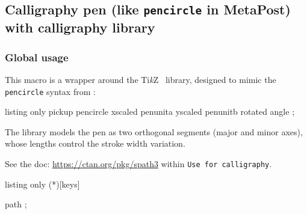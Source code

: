 \documentclass[11pt,a4paper]{ltxdoc}
\providecommand\tikzlogo{Ti\textit{k}Z}
\let\TikZ\tikzlogo
\begin{document}
\pagebreak

\subsection{Calligraphy pen (like \texttt{pencircle} in MetaPost) with calligraphy library}

\subsubsection{Global usage}

This macro is a wrapper around the \TikZ\  library, designed to mimic the \texttt{pencircle} syntax from :

\begin{DemoCode}{listing only}
pickup pencircle xscaled penunita yscaled penunitb rotated angle ;
\end{DemoCode}

The  library models the pen as two orthogonal segments
(major and minor axes), whose lengths control the stroke width variation.

\smallskip

See the doc: \url{https://ctan.org/pkg/spath3} within \texttt{Use for calligraphy}.

\begin{DemoCode}{listing only}
\calligraphypencircle(*)[keys]


\calligraphy[options] path ;
\end{DemoCode}

\begin{DemoCode}{}
\end{DemoCode}
\end{document}
